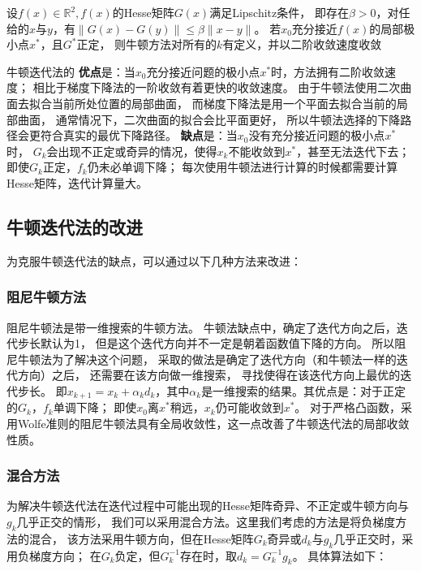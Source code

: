 \begin{theorem}\label{thm2_1}
    设$f(x) \in \mathbb{R}^2, f(x)$的Hesse矩阵$G(x)$满足Lipschitz条件，
    即存在$\beta>0$，对任给的$x$与$y$，有$\|G(x)-G(y)\|\leq\beta\|x-y\|$。
    若$x_0$充分接近$f(x)$的局部极小点$x^*$，且$G^*$正定，
    则牛顿方法对所有的$k$有定义，并以二阶收敛速度收敛
\end{theorem}
    
    牛顿迭代法的
    \textbf{优点}是：当$x_0$充分接近问题的极小点$x^*$时，方法拥有二阶收敛速度；
    相比于梯度下降法的一阶收敛有着更快的收敛速度。
    由于牛顿法使用二次曲面去拟合当前所处位置的局部曲面，
    而梯度下降法是用一个平面去拟合当前的局部曲面，
    通常情况下，二次曲面的拟合会比平面更好，
    所以牛顿法选择的下降路径会更符合真实的最优下降路径。
    \textbf{缺点}是：当$x_0$没有充分接近问题的极小点$x^*$时，
    $G_k$会出现不正定或奇异的情况，使得${x_k}$不能收敛到$x^*$，甚至无法迭代下去；
    即使$G_k$正定，${f_k}$仍未必单调下降；
    每次使用牛顿法进行计算的时候都需要计算Hesse矩阵，迭代计算量大。
    
    
\subsection{牛顿迭代法的改进}
    为克服牛顿迭代法的缺点，可以通过以下几种方法来改进：
    \subsubsection{阻尼牛顿方法}
        阻尼牛顿法是带一维搜索的牛顿方法。
        牛顿法缺点中，确定了迭代方向之后，迭代步长默认为1，
        但是这个迭代方向并不一定是朝着函数值下降的方向。
        所以阻尼牛顿法为了解决这个问题，
        采取的做法是确定了迭代方向（和牛顿法一样的迭代方向）之后，
        还需要在该方向做一维搜索，
        寻找使得在该迭代方向上最优的迭代步长。
        即$x_{k+1}=x_k+\alpha_kd_k$，其中$\alpha_k$是一维搜索的结果。其优点是：对于正定的$G_k$，${f_k}$单调下降；
        即使$x_0$离$x^*$稍远，${x_k}$仍可能收敛到$x^*$。
        对于严格凸函数，采用Wolfe准则的阻尼牛顿法具有全局收敛性，这一点改善了牛顿迭代法的局部收敛性质。
        
    \subsubsection{混合方法}
        为解决牛顿迭代法在迭代过程中可能出现的Hesse矩阵奇异、不正定或牛顿方向与$g_k$几乎正交的情形，
        我们可以采用混合方法。这里我们考虑的方法是将负梯度方法的混合，
        该方法采用牛顿方向，但在Hesse矩阵$G_k$奇异或$d_k$与$g_k$几乎正交时，采用负梯度方向；
        在$G_k$负定，但$G^{-1}_k$存在时，取$d_k=G^{-1}_kg_k$。
        具体算法如下：
        
